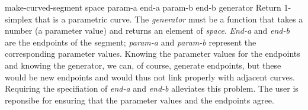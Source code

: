 \begin{functiondef}{make-curved-segment} {space param-a end-a param-b end-b generator} 
Return 1-simplex that is a parametric curve.  The {\em generator} must
be a function that takes a number (a parameter value) and returns an
element of {\em space}.  {\em End-a} and {\em end-b} are the endpoints
of the segment; {\em param-a} and {\em param-b} represent the
corresponding parameter values.  Knowing the parameter values for the
endpoints and knowing the generator, we can, of course, generate
endpoints, but these would be new endpoints and would thus not link
properly with adjacent curves.  Requiring the specifiation of {\em
end-a} and {\em end-b} alleviates this problem.  The user is reponsibe
for ensuring that the parameter values and the endpoints agree.
\end{functiondef}

